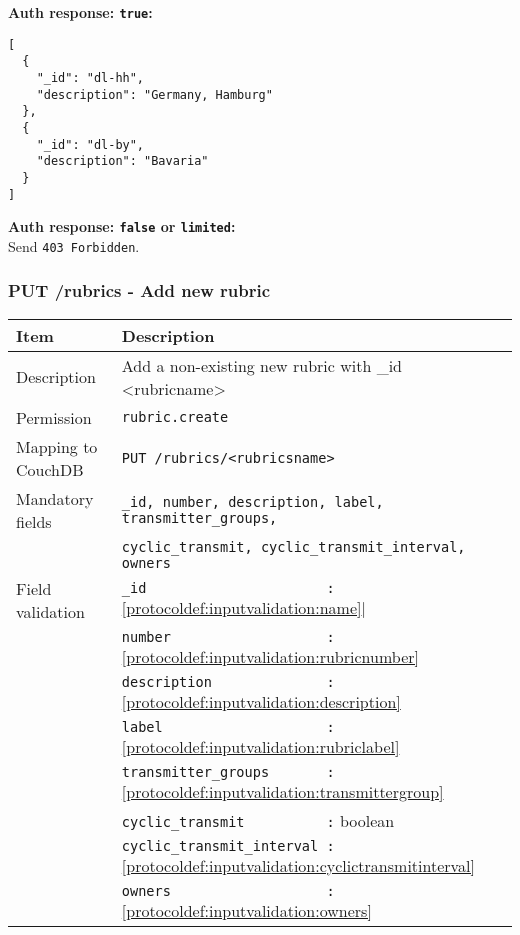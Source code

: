\textbf{Auth response: \texttt{true}:}
\begin{lstlisting}
[
  {
    "_id": "dl-hh",
    "description": "Germany, Hamburg"
  },
  {
    "_id": "dl-by",
    "description": "Bavaria"
  }
]
\end{lstlisting}

\textbf{Auth response: \texttt{false} or \texttt{limited}:}\\
Send \verb|403 Forbidden|.


\subsubsection{PUT /rubrics - Add new rubric}
\label{protocoldef:microservicesapi:database:putrubrics/rubrics_create}
\begin{table}[htbp]
  \begin{tabular}{|l|p{12cm}|} \hline
    Item               & Description  \\ \hline \hline
    Description        & Add a non-existing new rubric with \_id <rubricname>\\ \hline
    Permission         & \verb|rubric.create| \\ \hline
    Mapping to CouchDB & \verb|PUT /rubrics/<rubricsname>|\\ \hline
    Mandatory fields   & \verb|_id, number, description, label, transmitter_groups,| \\
                       & \verb|cyclic_transmit, cyclic_transmit_interval, owners| \\ \hline
    Field validation   & \verb|_id                      :| \ref{protocoldef:inputvalidation:name}| \\
                       & \verb|number                   :| \ref{protocoldef:inputvalidation:rubricnumber} \\
                       & \verb|description              :| \ref{protocoldef:inputvalidation:description} \\
                       & \verb|label                    :| \ref{protocoldef:inputvalidation:rubriclabel} \\
                       & \verb|transmitter_groups       :| \ref{protocoldef:inputvalidation:transmittergroup} \\
                       & \verb|cyclic_transmit          :| boolean \\
                       & \verb|cyclic_transmit_interval :| \ref{protocoldef:inputvalidation:cyclictransmitinterval} \\
                       & \verb|owners                   :| \ref{protocoldef:inputvalidation:owners} \\ \hline
  \end{tabular}
\end{table}

